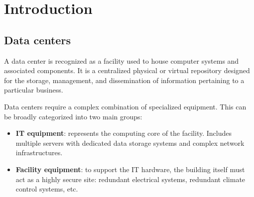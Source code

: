 \section{Introduction}

\subsection{Data centers}

A data center is recognized as a facility used to house computer systems and associated components.
It is a centralized physical or virtual repository designed for the storage, management, and dissemination of information pertaining to a particular business.

Data centers require a complex combination of specialized equipment.
This can be broadly categorized into two main groups:

\begin{itemize}
	\item \textbf{IT equipment}: represents the computing core of the facility.
	      Includes multiple servers with dedicated data storage systems and complex network infrastructures.
	\item \textbf{Facility equipment}: to support the IT hardware, the building itself must act as a highly secure site: redundant electrical systems, redundant climate control systems, etc.
\end{itemize}
